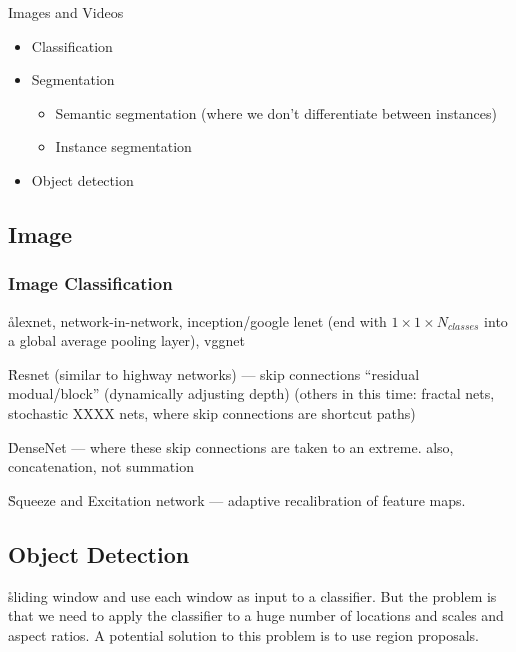



Images and Videos
\begin{itemize}[noitemsep,topsep=0pt]
	\item Classification
	\item Segmentation
	\begin{itemize}[noitemsep,topsep=0pt]
		\item Semantic segmentation (where we don't differentiate between instances)
		\item Instance segmentation
	\end{itemize}
	\item Object detection
\end{itemize}


\subsection{Image}

\subsubsection{Image Classification}
\r{alexnet, network-in-network, inception/google lenet (end with $1 \times 1 \times N_{classes}$ into a global average pooling layer), vggnet}

\r{Resnet (similar to highway networks) --- skip connections ``residual modual/block'' (dynamically adjusting depth) (others in this time: fractal nets, stochastic XXXX nets, where skip connections are shortcut paths)}

\r{DenseNet --- where these skip connections are taken to an extreme. also, concatenation, not summation}

\r{Squeeze and Excitation network --- adaptive recalibration of feature maps. }



\subsection{Object Detection}

\r{sliding window and use each window as input to a classifier. But the problem is that we need to apply the classifier to a huge number of locations and scales and aspect ratios. A potential solution to this problem is to use region proposals.}

